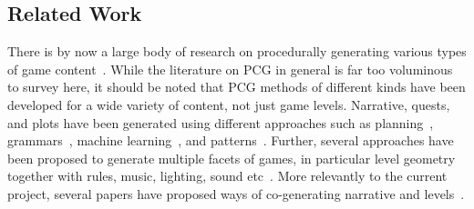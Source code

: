 \subsection{Related Work}


    
    
    

There is by now a large body of research on procedurally generating various types of game content~\cite{p11shaker_procedural_2016}. While the literature on PCG in general is far too voluminous to survey here, it should be noted that PCG methods of different kinds have been developed for a wide variety of content, not just game levels. Narrative, quests, and plots have been generated using different approaches such as planning~\cite{p11young_plans_2013}, grammars~\cite{p11hartsook_toward_2011,doran_prototype_2011}, machine learning~\cite{p11tambwekar_controllable_2019}, and patterns~\cite{p11trenton_quest_2010,breault_let_2021,alvarez_tropetwist_2022}. Further, several approaches have been proposed to generate multiple facets of games, in particular level geometry together with rules, music, lighting, sound etc~\cite{p11liapis_computational_2014,liapis_orchestrating_2019,hoover_audioinspace_2015,holtar_audioverdrive_2013,karavolos_multi-faceted_2019,cook_rogue_2014,treanor_game-o-matic_2012,green_data_2018}. More relevantly to the current project, several papers have proposed ways of co-generating narrative and levels~\cite{p11ashmore_quest_2007,hartsook_toward_2011,dormans_generating_2011,abuzuraiq_taksim_2019}.

